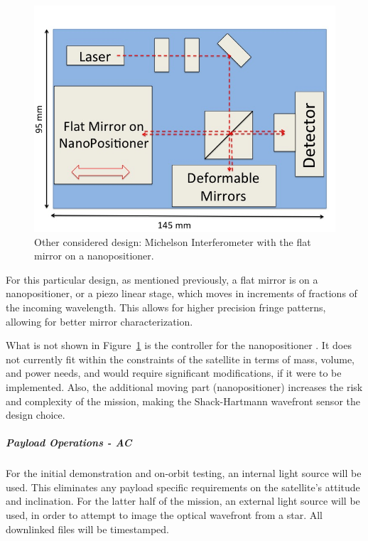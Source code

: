\documentclass[12pt]{article}
\begin{document}
\begin{figure}[ht]
\centering
  \includegraphics[width=5in]{images/payload_interferometer.jpg}
\caption{Other considered design: Michelson Interferometer with the flat mirror on a nanopositioner.}
\label{fig:interferometer}
\end{figure}

For this particular design, as mentioned previously, a flat mirror is on a nanopositioner, or a piezo linear stage, which moves in increments of fractions of the incoming wavelength. This allows for higher precision fringe patterns, allowing for better mirror characterization.

What is not shown in Figure~\ref{fig:interferometer} is the controller for the nanopositioner \cite{newport_nanopositioner}. It does not currently fit within the constraints of the satellite in terms of mass, volume, and power needs, and would require significant modifications, if it were to be implemented. Also, the additional moving part (nanopositioner) increases the risk and complexity of the mission, making the Shack-Hartmann wavefront sensor the design choice.

\subparagraph{Payload Operations - AC}
For the initial demonstration and on-orbit testing, an internal light
source will be used. This eliminates any payload specific requirements
on the satellite's attitude and inclination. For the latter half of
the mission, an external light source will be used, in order to attempt to image the optical wavefront from a star.  All downlinked files will be timestamped.
\end{document}
